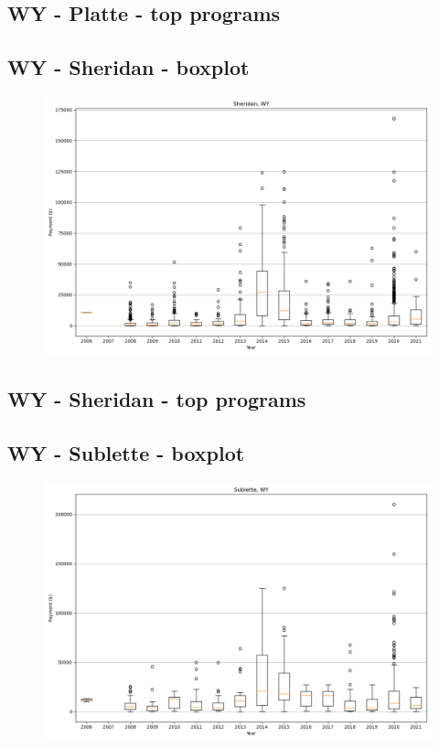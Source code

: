 \subsection*{WY - Platte - top programs}

\newpage
\subsection*{WY - Sheridan - boxplot}
\begin{figure}[h]
\centering
\includegraphics[width=7in]{../output/boxplots/counties/Sheridan-WY_boxplot.png}
\end{figure}


\subsection*{WY - Sheridan - top programs}

\newpage
\subsection*{WY - Sublette - boxplot}
\begin{figure}[h]
\centering
\includegraphics[width=7in]{../output/boxplots/counties/Sublette-WY_boxplot.png}
\end{figure}


